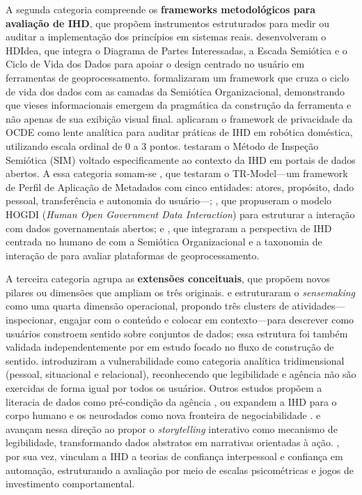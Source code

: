 \documentclass[
	12pt,				%
	oneside,			%
	a4paper,			%
	english,			%
	brazil				%
	]{abntex2ppgsi}
\begin{document}
    A segunda categoria compreende os \textbf{frameworks metodológicos para avaliação de IHD}, que propõem instrumentos estruturados para medir ou auditar a implementação dos princípios em sistemas reais.  desenvolveram o HDIdea, que integra o Diagrama de Partes Interessadas, a Escada Semiótica e o Ciclo de Vida dos Dados para apoiar o design centrado no usuário em ferramentas de geoprocessamento.  formalizaram um framework que 
    cruza o ciclo de vida dos dados com as camadas da Semiótica Organizacional, demonstrando que vieses informacionais emergem da pragmática da construção da ferramenta e não apenas de sua exibição visual final.  aplicaram o framework 
    de privacidade da OCDE como lente analítica para auditar práticas de IHD em robótica doméstica, utilizando escala ordinal de 0 a 3 pontos.  testaram o Método de Inspeção Semiótica (SIM) voltado especificamente ao contexto da IHD em portais de dados 
    abertos. A essa categoria somam-se , que testaram o TR-Model---um framework de Perfil de Aplicação de Metadados com cinco entidades: atores, propósito, dado pessoal, transferência e autonomia do usuário---; , que propuseram o modelo HOGDI (\textit{Human Open Government Data Interaction}) para estruturar a interação com dados governamentais abertos; e , que integraram a perspectiva de IHD centrada no humano de  com a Semiótica Organizacional e a taxonomia de interação de  para avaliar plataformas de geoprocessamento.

    A terceira categoria agrupa as \textbf{extensões conceituais}, que propõem novos pilares ou dimensões que ampliam os três originais.  e  estruturaram o \textit{sensemaking} como uma quarta dimensão operacional, 
    propondo três clusters de atividades---inspecionar, engajar com o conteúdo e colocar em contexto---para descrever como usuários constroem sentido 
    sobre conjuntos de dados; essa estrutura foi também validada independentemente por  em estudo focado no fluxo de construção de sentido.  introduziram a 
    vulnerabilidade como categoria analítica tridimensional (pessoal, situacional e relacional), reconhecendo que legibilidade e agência não são exercidas de forma igual por todos os usuários. Outros estudos propõem a literacia de dados como pré-condição da agência \cite{Yuan20243615, Bartram2022}, ou expandem a IHD para o corpo humano 
    e os neurodados como nova fronteira de negociabilidade \cite{Lenzi2024}.  e  avançam nessa direção ao propor o \textit{storytelling} interativo como mecanismo de legibilidade, transformando dados abstratos em narrativas orientadas à ação. , por sua vez, vinculam a IHD a teorias de confiança interpessoal e confiança em automação, estruturando a avaliação por meio de escalas psicométricas e jogos de investimento comportamental.
\end{document}
